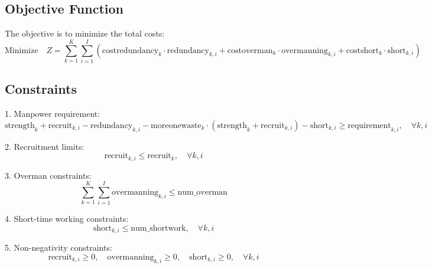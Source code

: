 \documentclass{article}
\begin{document}
\subsection*{Objective Function}
The objective is to minimize the total costs:
\[
\text{Minimize} \quad Z = \sum_{k=1}^{K} \sum_{i=1}^{I} \left( \text{costredundancy}_{k} \cdot \text{redundancy}_{k,i} + 
\text{costoverman}_{k} \cdot \text{overmanning}_{k,i} + \text{costshort}_{k} \cdot \text{short}_{k,i} \right)
\]

\subsection*{Constraints}
1. Manpower requirement:
\[
\text{strength}_{k} + \text{recruit}_{k,i} - \text{redundancy}_{k,i} - \text{moreonewaste}_{k} \cdot (\text{strength}_{k} + \text{recruit}_{k,i}) - \text{short}_{k,i} \geq \text{requirement}_{k,i}, \quad \forall k, i
\]

2. Recruitment limits:
\[
\text{recruit}_{k,i} \leq \text{recruit}_{k}, \quad \forall k, i
\]

3. Overman constraints:
\[
\sum_{k=1}^{K} \sum_{i=1}^{I} \text{overmanning}_{k,i} \leq \text{num\_overman}
\]

4. Short-time working constraints:
\[
\text{short}_{k,i} \leq \text{num\_shortwork}, \quad \forall k, i
\]

5. Non-negativity constraints:
\[
\text{recruit}_{k,i} \geq 0, \quad \text{overmanning}_{k,i} \geq 0, \quad \text{short}_{k,i} \geq 0, \quad \forall k, i
\]
\end{document}
